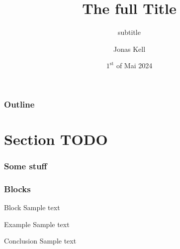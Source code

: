 \documentclass[aspectratio=169]{beamer}
\title[small title]{The full Title} %
\subtitle{subtitle}
\author{Jonas Kell}
\institute[TP III]{Chair for theoretical Physics III}
\date[01.05.2024]{$1^{\text{st}}$ of Mai 2024} %
\begin{document}
    \begin{frame}[t,plain] 
        \maketitle
    \end{frame}

    \begin{frame}
        \frametitle{Outline}
        \tableofcontents
    \end{frame}

    \section{Section TODO}

    \begin{frame}[t]
        \frametitle{Some stuff}
    \end{frame}

    \begin{frame}
        \frametitle{Blocks}

        \begin{block}{Block}
            Sample text
        \end{block}

        \begin{exampleblock}{Example}
            Sample text
        \end{exampleblock}

        \begin{alertblock}{Conclusion}
            Sample text
        \end{alertblock}
    \end{frame}
\end{document}
